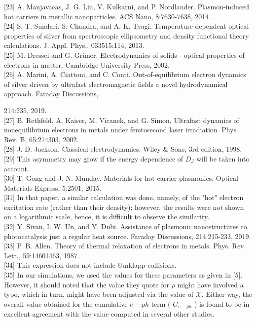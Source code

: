 \documentclass[10pt]{article}
\begin{document}
[23] A. Manjavacas, J. G. Liu, V. Kulkarni, and P. Nordlander. Plasmon-induced hot carriers in metallic nanoparticles. ACS Nano, 8:7630-7638, 2014.\\[0pt]
[24] S. T. Sundari, S. Chandra, and A. K. Tyagi. Temperature dependent optical properties of silver from spectroscopic ellipsometry and density functional theory calculations. J. Appl. Phys., 033515:114, 2013.\\[0pt]
[25] M. Dressel and G. Grüner. Electrodynamics of solids - optical properties of electrons in matter. Cambridge University Press, 2002.\\[0pt]
[26] A. Marini, A. Ciattoni, and C. Conti. Out-of-equilibrium electron dynamics of silver driven by ultrafast electromagnetic fields a novel hydrodynamical approach. Faraday Discussions,

214:235, 2019.\\[0pt]
[27] B. Rethfeld, A. Kaiser, M. Vicanek, and G. Simon. Ultrafast dynamics of nonequilibrium electrons in metals under femtosecond laser irradiation. Phys. Rev. B, 65:214303, 2002.\\[0pt]
[28] J. D. Jackson. Classical electrodynamics. Wiley \& Sons, 3rd edition, 1998.\\[0pt]
[29] This asymmetry may grow if the energy dependence of $D_{J}$ will be taken into account.\\[0pt]
[30] T. Gong and J. N. Munday. Materials for hot carrier plasmonics. Optical Materials Express, 5:2501, 2015.\\[0pt]
[31] In that paper, a similar calculation was done, namely, of the "hot" electron excitation rate (rather than their density); however, the results were not shown on a logarithmic scale, hence, it is difficult to observe the similarity.\\[0pt]
[32] Y. Sivan, I. W. Un, and Y. Dubi. Assistance of plasmonic nanostructures to photocatalysis just a regular heat source. Faraday Discussions, 214:215-233, 2019.\\[0pt]
[33] P. B. Allen. Theory of thermal relaxation of electrons in metals. Phys. Rev. Lett., 59:14601463, 1987.\\[0pt]
[34] This expression does not include Umklapp collisions.\\[0pt]
[35] In our simulations, we used the values for these parameters as given in [5]. However, it should noted that the value they quote for $\rho$ might have involved a typo, which in turn, might have been adjusted via the value of $\mathcal{X}$. Either way, the overall value obtained for the cumulative $e-p h$ term ( $G_{e-p h}$ ) is found to be in excellent agreement with the value computed in several other studies.\\[0pt]
\end{document}
